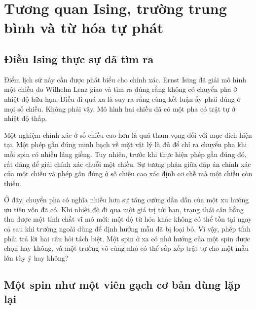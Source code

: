 \chapter{Tương quan Ising, trường trung bình và từ hóa tự phát}


\section{Điều Ising thực sự đã tìm ra}

Điểm lịch sử này cần được phát biểu cho chính xác. Ernst Ising đã giải mô hình một chiều do Wilhelm Lenz giao và tìm ra đúng rằng không có chuyển pha ở nhiệt độ hữu hạn. Điều đi quá xa là suy ra rằng cùng kết luận ấy phải đúng ở mọi số chiều. Không phải vậy. Mô hình hai chiều đã có một pha có trật tự ở nhiệt độ thấp.

Một nghiệm chính xác ở số chiều cao hơn là quá tham vọng đối với mục đích hiện tại. Một phép gần đúng minh bạch về mặt vật lý là đủ để chỉ ra chuyển pha khi mỗi spin có nhiều láng giềng. Tuy nhiên, trước khi thực hiện phép gần đúng đó, rất đáng để giải chính xác chuỗi một chiều. Sự tương phản giữa đáp án chính xác của một chiều và phép gần đúng ở số chiều cao xác định cơ chế mà một chiều còn thiếu.

Ở đây, chuyển pha có nghĩa nhiều hơn sự tăng cường dần dần của một xu hướng ưu tiên vốn đã có. Khi nhiệt độ đi qua một giá trị tới hạn, trạng thái cân bằng thu được một tính chất vĩ mô mới: một độ từ hóa khác không có thể tồn tại ngay cả sau khi trường ngoài dùng để định hướng mẫu đã bị loại bỏ. Vì vậy, phép tính phải trả lời hai câu hỏi tách biệt. Một spin ở xa có nhớ hướng của một spin được chọn hay không, và một trường vô cùng nhỏ có thể sắp xếp trật tự cho một mẫu lớn tùy ý hay không?

\section{Một spin như một viên gạch cơ bản dùng lặp lại}

